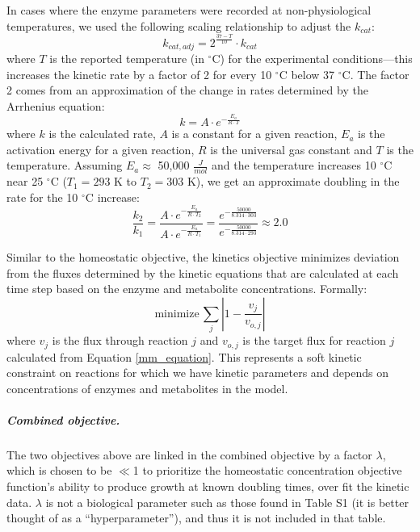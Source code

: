 \documentclass[12pt]{article}
\begin{document}
In cases where the enzyme parameters were recorded at non-physiological temperatures, we used the following scaling relationship to adjust the $k_{cat}$:
\begin{equation}
k_{cat,adj} = 2^{\frac{37 - T}{10}}\cdot k_{cat}
\end{equation}
where \(T\) is the reported temperature (in \(^\circ\)C) for the experimental conditions---this increases the kinetic rate by a factor of 2 for every 10 \(^\circ\)C below 37 \(^\circ\)C.  The factor 2 comes from an approximation of the change in rates determined by the Arrhenius equation:
\begin{equation}
k = A\cdot e^{-\frac{E_a}{R\cdot T}}
\end{equation}
\noindent where $k$ is the calculated rate, $A$ is a constant for a given reaction, $E_a$ is the activation energy for a given reaction, $R$ is the universal gas constant and $T$ is the temperature.  Assuming $E_a \approx$ 50,000 $\frac{J}{mol}$ and the temperature increases 10 $^\circ$C near 25 $^\circ$C ($T_1 = 293$ K to $T_2 = 303$ K), we get an approximate doubling in the rate for the 10 $^\circ$C increase:
\begin{equation}
\frac{k_2}{k_1} = \frac{A\cdot e^{-\frac{E_a}{R\cdot T_2}}}{A\cdot e^{-\frac{E_a}{R\cdot T_1}}} = \frac{e^{-\frac{50000}{8.314\cdot 303}}}{e^{-\frac{50000}{8.314\cdot 293}}} \approx 2.0
\end{equation}

Similar to the homeostatic objective, the kinetics objective minimizes deviation from the fluxes determined by the kinetic equations that are calculated at each time step based on the enzyme and metabolite concentrations.  Formally:
\begin{equation}
\mathrm{minimize } \, \sum_{j} \left| 1-\frac{v_j}{v_{o,j}} \right|
\end{equation}
where $v_j$ is the flux through reaction $j$ and $v_{o,j}$ is the target flux for reaction \(j\) calculated from Equation \ref{mm_equation}.  This represents a soft kinetic constraint on reactions for which we have kinetic parameters and depends on concentrations of enzymes and metabolites in the model.

\subparagraph{Combined objective.}
The two objectives above are linked in the combined objective by a factor $\lambda$, which is chosen to be $\ll$1 to prioritize the homeostatic concentration objective function's ability to produce growth at known doubling times, over fit the kinetic data.  $\lambda$ is not a biological parameter such as those found in Table S1 (it is  better thought of as a ``hyperparameter''), and thus it is not included in that table.
\end{document}
